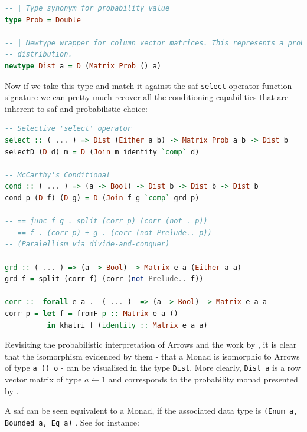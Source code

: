 \documentclass[
  oneside,
  11pt, a4paper,
  footinclude=true,
  headinclude=true,
  cleardoublepage=empty
]{scrbook}
\theoremstyle{definition}
\theoremstyle{definition}
\begin{document}
        \begin{lstlisting}[language=Haskell, caption={Dist type alias},captionpos=b]
-- | Type synonym for probability value
type Prob = Double

-- | Newtype wrapper for column vector matrices. This represents a probability
-- distribution.
newtype Dist a = D (Matrix Prob () a)
        \end{lstlisting}
        
        Now if we take this type and match it against the \gls{saf} \texttt{select} operator function signature we can pretty much recover all the conditioning capabilities that are inherent to \gls{saf} and probabilistic choice:
        
        \begin{lstlisting}[language=Haskell, caption={Dist - \texttt{select} and \texttt{cond} operators},captionpos=b]
-- Selective 'select' operator
select :: ( ... ) => Dist (Either a b) -> Matrix Prob a b -> Dist b 
selectD (D d) m = D (Join m identity `comp` d)

-- McCarthy's Conditional
cond :: ( ... ) => (a -> Bool) -> Dist b -> Dist b -> Dist b
cond p (D f) (D g) = D (Join f g `comp` grd p)

-- == junc f g . split (corr p) (corr (not . p))
-- == f . (corr p) + g . (corr (not Prelude.. p))
-- (Paralellism via divide-and-conquer)

grd :: ( ... ) => (a -> Bool) -> Matrix e a (Either a a)
grd f = split (corr f) (corr (not Prelude.. f))

corr ::  forall e a .  ( ... )  => (a -> Bool) -> Matrix e a a
corr p = let f = fromF p :: Matrix e a ()
          in khatri f (identity :: Matrix e a a)
        \end{lstlisting}{}
        
        Revisiting the probabilistic interpretation of Arrows and the work by \cite{Lindley:2011:IOA:1953652.1954016}, it is clear that the isomorphism evidenced by them - that a Monad is isomorphic to Arrows of type \texttt{a () o} - can be visualised in the type \texttt{Dist}. More clearly, \texttt{Dist a} is a row vector matrix of type $a \leftarrow 1$ and corresponds to the probability monad presented by \cite{erwig_kollmansberger_2006}.
        
        A \gls{saf} can be seen equivalent to a Monad, if the associated data type is \texttt{(Enum a, Bounded a, Eq a)} \citep{andrey2019selective}. See for instance:
        
\end{document}
